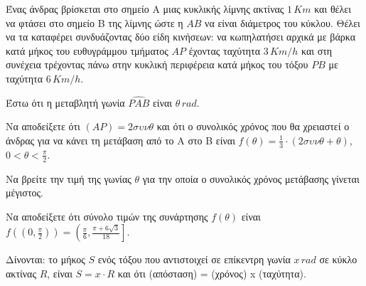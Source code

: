 Ένας άνδρας βρίσκεται στο σημείο A μιας κυκλικής λίμνης ακτίνας $1\,Km$ και θέλει να φτάσει στο σημείο B της λίμνης ώστε η $AB$ να είναι διάμετρος του κύκλου. Θέλει να τα καταφέρει συνδυάζοντας δύο είδη κινήσεων: να κωπηλατήσει αρχικά με βάρκα κατά μήκος του ευθυγράμμου τμήματος $AP$ έχοντας ταχύτητα $3\,Km/h$ και στη συνέχεια τρέχοντας πάνω στην κυκλική περιφέρεια κατά μήκος του τόξου $PB$ με ταχύτητα $6\,Km/h$.

Έστω ότι η μεταβλητή γωνία $\widehat{PAB}$ είναι $\theta\,rad$.

\begin{alist}
\item Να αποδείξετε ότι $(AP) = 2\sigma\upsilon\nu\theta$ και ότι ο συνολικός χρόνος που θα χρειαστεί ο άνδρας για να κάνει τη μετάβαση από το A στο B είναι $f(\theta) = \frac{1}{3} \cdot (2\sigma\upsilon\nu\theta + \theta)$, $0 < \theta < \frac{\pi}{2}$. 
\item Να βρείτε την τιμή της γωνίας $\theta$ για την οποία ο συνολικός χρόνος μετάβασης γίνεται μέγιστος. 
\item Να αποδείξετε ότι σύνολο τιμών της συνάρτησης $f(\theta)$ είναι $f\left(\left(0, \frac{\pi}{2}\right)\right) = \left(\frac{\pi}{6}, \frac{\pi+6\sqrt{3}}{18}\right]$. 
\end{alist}

Δίνονται: το μήκος $S$ ενός τόξου που αντιστοιχεί σε επίκεντρη γωνία $x\,rad$ σε κύκλο ακτίνας $R$, είναι $S = x \cdot R$ και ότι (απόσταση) = (χρόνος) x (ταχύτητα).